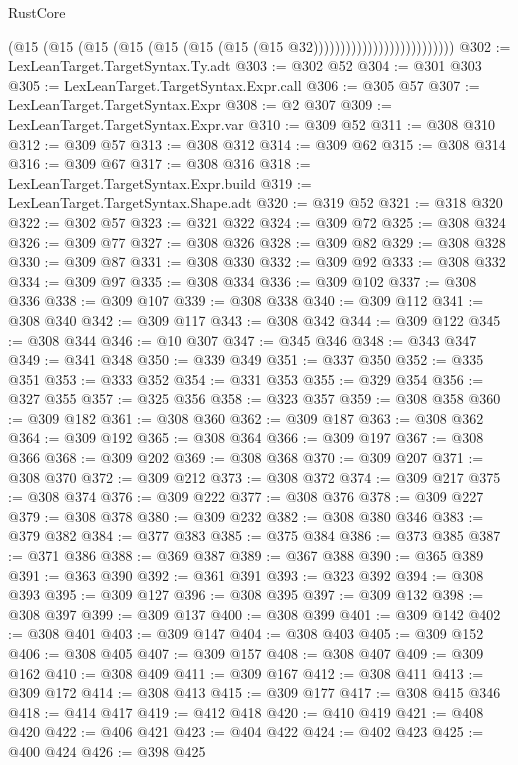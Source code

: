 \begin{lexlean}{RustCore}
\begin{coremodule}
                                        (@15
                                          (@15
                                            (@15
                                              (@15 (@15 (@15 (@15 (@15 @32))))))))))))))))))))))))))
@302 := LexLeanTarget.TargetSyntax.Ty.adt
@303 := @302 @52
@304 := @301 @303
@305 := LexLeanTarget.TargetSyntax.Expr.call
@306 := @305 @57
@307 := LexLeanTarget.TargetSyntax.Expr
@308 := @2 @307
@309 := LexLeanTarget.TargetSyntax.Expr.var
@310 := @309 @52
@311 := @308 @310
@312 := @309 @57
@313 := @308 @312
@314 := @309 @62
@315 := @308 @314
@316 := @309 @67
@317 := @308 @316
@318 := LexLeanTarget.TargetSyntax.Expr.build
@319 := LexLeanTarget.TargetSyntax.Shape.adt
@320 := @319 @52
@321 := @318 @320
@322 := @302 @57
@323 := @321 @322
@324 := @309 @72
@325 := @308 @324
@326 := @309 @77
@327 := @308 @326
@328 := @309 @82
@329 := @308 @328
@330 := @309 @87
@331 := @308 @330
@332 := @309 @92
@333 := @308 @332
@334 := @309 @97
@335 := @308 @334
@336 := @309 @102
@337 := @308 @336
@338 := @309 @107
@339 := @308 @338
@340 := @309 @112
@341 := @308 @340
@342 := @309 @117
@343 := @308 @342
@344 := @309 @122
@345 := @308 @344
@346 := @10 @307
@347 := @345 @346
@348 := @343 @347
@349 := @341 @348
@350 := @339 @349
@351 := @337 @350
@352 := @335 @351
@353 := @333 @352
@354 := @331 @353
@355 := @329 @354
@356 := @327 @355
@357 := @325 @356
@358 := @323 @357
@359 := @308 @358
@360 := @309 @182
@361 := @308 @360
@362 := @309 @187
@363 := @308 @362
@364 := @309 @192
@365 := @308 @364
@366 := @309 @197
@367 := @308 @366
@368 := @309 @202
@369 := @308 @368
@370 := @309 @207
@371 := @308 @370
@372 := @309 @212
@373 := @308 @372
@374 := @309 @217
@375 := @308 @374
@376 := @309 @222
@377 := @308 @376
@378 := @309 @227
@379 := @308 @378
@380 := @309 @232
@382 := @308 @380 @346
@383 := @379 @382
@384 := @377 @383
@385 := @375 @384
@386 := @373 @385
@387 := @371 @386
@388 := @369 @387
@389 := @367 @388
@390 := @365 @389
@391 := @363 @390
@392 := @361 @391
@393 := @323 @392
@394 := @308 @393
@395 := @309 @127
@396 := @308 @395
@397 := @309 @132
@398 := @308 @397
@399 := @309 @137
@400 := @308 @399
@401 := @309 @142
@402 := @308 @401
@403 := @309 @147
@404 := @308 @403
@405 := @309 @152
@406 := @308 @405
@407 := @309 @157
@408 := @308 @407
@409 := @309 @162
@410 := @308 @409
@411 := @309 @167
@412 := @308 @411
@413 := @309 @172
@414 := @308 @413
@415 := @309 @177
@417 := @308 @415 @346
@418 := @414 @417
@419 := @412 @418
@420 := @410 @419
@421 := @408 @420
@422 := @406 @421
@423 := @404 @422
@424 := @402 @423
@425 := @400 @424
@426 := @398 @425

\end{coremodule}
\end{lexlean}
